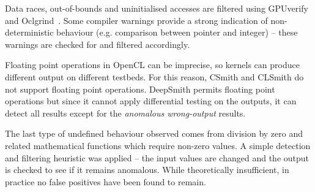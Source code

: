 Data races, out-of-bounds and uninitialised accesses are filtered using GPUverify~\cite{Betts2012} and Oclgrind~\cite{Price2015}. Some compiler warnings provide a strong indication of non-deterministic behaviour (e.g. comparison between pointer and integer) -- these warnings are checked for and filtered accordingly.

Floating point operations in OpenCL can be imprecise, so kernels can produce different output on different testbeds. For this reason, CSmith and CLSmith do not support floating point operations. DeepSmith permits floating point operations but since it cannot apply differential testing on the outputs, it can detect all results except for the \emph{anomalous wrong-output} results.

The last type of undefined behaviour observed comes from division by zero and related mathematical functions which require non-zero values. A simple detection and filtering heuristic was applied -- the input values are changed and the output is checked to see if it remains anomalous. While theoretically insufficient, in practice no false positives have been found to remain.
